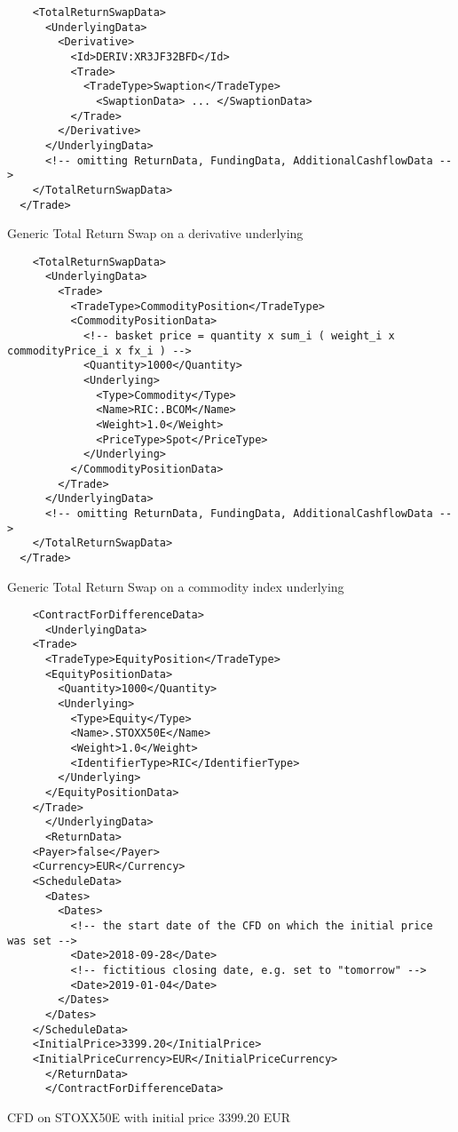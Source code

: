 \begin{listing}[H]
\begin{verbatim}
    <TotalReturnSwapData>
      <UnderlyingData>
        <Derivative>
          <Id>DERIV:XR3JF32BFD</Id>
          <Trade>
            <TradeType>Swaption</TradeType>
              <SwaptionData> ... </SwaptionData>
          </Trade>
        </Derivative>
      </UnderlyingData>
      <!-- omitting ReturnData, FundingData, AdditionalCashflowData -->
    </TotalReturnSwapData>
  </Trade>
\end{verbatim}
\caption{Generic Total Return Swap on a derivative underlying}
\label{lst:trsdata4}
\end{listing}

\begin{listing}[H]
\begin{verbatim}
    <TotalReturnSwapData>
      <UnderlyingData>
        <Trade>
          <TradeType>CommodityPosition</TradeType>
          <CommodityPositionData>
            <!-- basket price = quantity x sum_i ( weight_i x commodityPrice_i x fx_i ) -->
            <Quantity>1000</Quantity>
            <Underlying>
              <Type>Commodity</Type>
              <Name>RIC:.BCOM</Name>
              <Weight>1.0</Weight>
              <PriceType>Spot</PriceType>
            </Underlying>
          </CommodityPositionData>
        </Trade>
      </UnderlyingData>
      <!-- omitting ReturnData, FundingData, AdditionalCashflowData -->
    </TotalReturnSwapData>
  </Trade>
\end{verbatim}
\caption{Generic Total Return Swap on a commodity index underlying}
\label{lst:trsdata5}
\end{listing}

\begin{listing}[H]
\begin{verbatim}
    <ContractForDifferenceData>
      <UnderlyingData>
	<Trade>
	  <TradeType>EquityPosition</TradeType>
	  <EquityPositionData>
	    <Quantity>1000</Quantity>
	    <Underlying>
	      <Type>Equity</Type>
	      <Name>.STOXX50E</Name>
	      <Weight>1.0</Weight>
	      <IdentifierType>RIC</IdentifierType>
	    </Underlying>
	  </EquityPositionData>
	</Trade>
      </UnderlyingData>
      <ReturnData>
	<Payer>false</Payer>
	<Currency>EUR</Currency>
	<ScheduleData>
	  <Dates>
	    <Dates>
	      <!-- the start date of the CFD on which the initial price was set -->
	      <Date>2018-09-28</Date>
	      <!-- fictitious closing date, e.g. set to "tomorrow" -->
	      <Date>2019-01-04</Date>
	    </Dates>
	  </Dates>
	</ScheduleData>
	<InitialPrice>3399.20</InitialPrice>
	<InitialPriceCurrency>EUR</InitialPriceCurrency>
      </ReturnData>
      </ContractForDifferenceData>
\end{verbatim}
\caption{CFD on STOXX50E with initial price 3399.20 EUR}
\label{lst:trsdata_cfd}
\end{listing}
